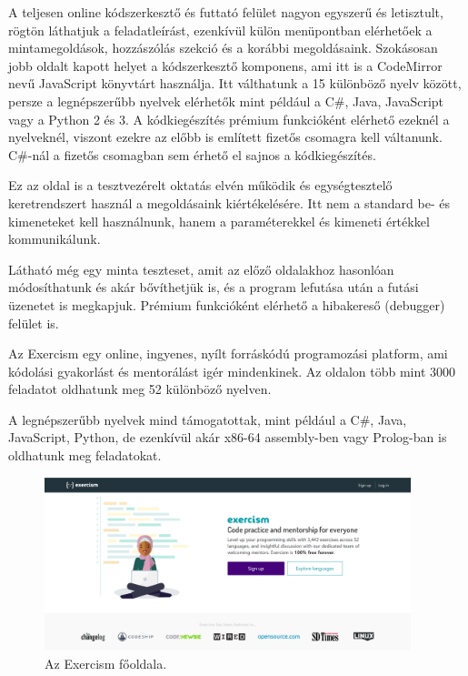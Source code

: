 A teljesen online kódszerkesztő és futtató felület nagyon egyszerű és letisztult, rögtön láthatjuk a feladatleírást, ezenkívül külön menüpontban elérhetőek a mintamegoldások, hozzászólás szekció és a korábbi megoldásaink. Szokásosan jobb oldalt kapott helyet a kódszerkesztő komponens, ami itt is a CodeMirror nevű JavaScript könyvtárt használja. Itt válthatunk a 15 különböző nyelv között, persze a legnépszerűbb nyelvek elérhetők mint például a C\#, Java, JavaScript vagy a Python 2 és 3. A kódkiegészítés prémium funkcióként elérhető ezeknél a nyelveknél, viszont ezekre az előbb is említett fizetős csomagra kell váltanunk. C\#-nál a fizetős csomagban sem érhető el sajnos a kódkiegészítés.

Ez az oldal is a tesztvezérelt oktatás elvén működik és egységtesztelő keretrendszert használ a megoldásaink kiértékelésére. Itt nem a standard be- és kimeneteket kell használnunk, hanem a paraméterekkel és kimeneti értékkel kommunikálunk.

Látható még egy minta teszteset, amit az előző oldalakhoz hasonlóan módosíthatunk és akár bővíthetjük is, és a program lefutása után a futási üzenetet is megkapjuk. Prémium funkcióként elérhető a hibakereső (debugger) felület is.


Az Exercism egy online, ingyenes, nyílt forráskódú programozási platform, ami kódolási gyakorlást és mentorálást igér mindenkinek. Az oldalon több mint 3000 feladatot oldhatunk meg 52 különböző nyelven. \cite{exercism}

A legnépszerűbb nyelvek mind támogatottak, mint például a C\#, Java, JavaScript, Python, de ezenkívül akár x86-64 assembly-ben vagy Prolog-ban is oldhatunk meg feladatokat.

\begin{figure}[h]
    \centering
    \includegraphics[width=0.95\textwidth]{images/exercism_homepage.png}
    \caption{Az Exercism főoldala.}
    \label{fig:exercism_homepage}
\end{figure}

